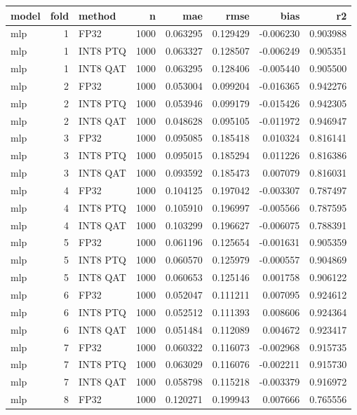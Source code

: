 \begin{tabular}{lrlrrrrr}
\toprule
model & fold & method & n & mae & rmse & bias & r2 \\
\midrule
mlp & 1 & FP32 & 1000 & 0.063295 & 0.129429 & -0.006230 & 0.903988 \\
mlp & 1 & INT8 PTQ & 1000 & 0.063327 & 0.128507 & -0.006249 & 0.905351 \\
mlp & 1 & INT8 QAT & 1000 & 0.063295 & 0.128406 & -0.005440 & 0.905500 \\
mlp & 2 & FP32 & 1000 & 0.053004 & 0.099204 & -0.016365 & 0.942276 \\
mlp & 2 & INT8 PTQ & 1000 & 0.053946 & 0.099179 & -0.015426 & 0.942305 \\
mlp & 2 & INT8 QAT & 1000 & 0.048628 & 0.095105 & -0.011972 & 0.946947 \\
mlp & 3 & FP32 & 1000 & 0.095085 & 0.185418 & 0.010324 & 0.816141 \\
mlp & 3 & INT8 PTQ & 1000 & 0.095015 & 0.185294 & 0.011226 & 0.816386 \\
mlp & 3 & INT8 QAT & 1000 & 0.093592 & 0.185473 & 0.007079 & 0.816031 \\
mlp & 4 & FP32 & 1000 & 0.104125 & 0.197042 & -0.003307 & 0.787497 \\
mlp & 4 & INT8 PTQ & 1000 & 0.105910 & 0.196997 & -0.005566 & 0.787595 \\
mlp & 4 & INT8 QAT & 1000 & 0.103299 & 0.196627 & -0.006075 & 0.788391 \\
mlp & 5 & FP32 & 1000 & 0.061196 & 0.125654 & -0.001631 & 0.905359 \\
mlp & 5 & INT8 PTQ & 1000 & 0.060570 & 0.125979 & -0.000557 & 0.904869 \\
mlp & 5 & INT8 QAT & 1000 & 0.060653 & 0.125146 & 0.001758 & 0.906122 \\
mlp & 6 & FP32 & 1000 & 0.052047 & 0.111211 & 0.007095 & 0.924612 \\
mlp & 6 & INT8 PTQ & 1000 & 0.052512 & 0.111393 & 0.008606 & 0.924364 \\
mlp & 6 & INT8 QAT & 1000 & 0.051484 & 0.112089 & 0.004672 & 0.923417 \\
mlp & 7 & FP32 & 1000 & 0.060322 & 0.116073 & -0.002968 & 0.915735 \\
mlp & 7 & INT8 PTQ & 1000 & 0.063029 & 0.116076 & -0.002211 & 0.915730 \\
mlp & 7 & INT8 QAT & 1000 & 0.058798 & 0.115218 & -0.003379 & 0.916972 \\
mlp & 8 & FP32 & 1000 & 0.120271 & 0.199943 & 0.007666 & 0.765556 \\

\end{tabular}
